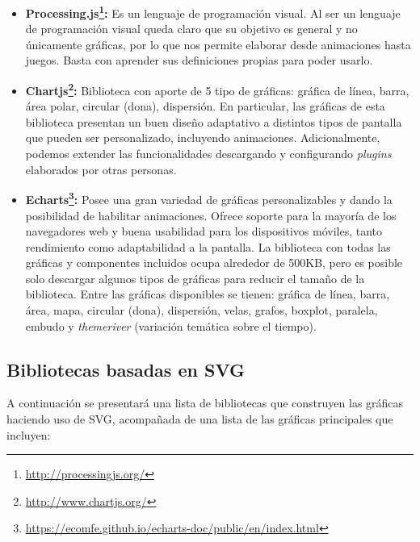 \begin{itemize}
\item\textbf{Processing.js\footnote{\url{http://processingjs.org/}}:}
Es un lenguaje de programación visual. Al ser un lenguaje de programación visual queda claro que su objetivo es general y no únicamente gráficas, por lo que nos permite elaborar desde animaciones hasta juegos. Basta con aprender sus definiciones propias para poder usarlo.
\item\textbf{Chartjs\footnote{\url{http://www.chartjs.org/}}:}
Biblioteca con aporte de 5 tipo de gráficas: gráfica de línea, barra, área polar, circular (dona), dispersión. En particular, las gráficas de esta biblioteca presentan un buen diseño adaptativo a distintos tipos de pantalla que pueden ser personalizado, incluyendo animaciones. Adicionalmente, podemos extender las funcionalidades descargando y configurando \textit{plugins} elaborados por otras personas.
\item\textbf{Echarts\footnote{\url{https://ecomfe.github.io/echarts-doc/public/en/index.html}}:}
Posee una gran variedad de gráficas personalizables y dando la posibilidad de habilitar animaciones. Ofrece soporte para la mayoría de los navegadores web y buena usabilidad para los dispositivos móviles, tanto rendimiento como adaptabilidad a la pantalla. La biblioteca con todas las gráficas y componentes incluidos ocupa alrededor de 500KB, pero es posible solo descargar algunos tipos de gráficas para reducir el tamaño de la biblioteca. Entre las gráficas disponibles se tienen: gráfica de línea, barra, área, mapa, circular (dona), dispersión, velas, grafos, boxplot, paralela, embudo y \textit{themeriver} (variación temática sobre el tiempo).
\end{itemize}

\subsection{Bibliotecas basadas en SVG}
A continuación se presentará una lista de bibliotecas que construyen las gráficas haciendo uso de SVG, acompañada de una lista de las gráficas principales que incluyen:

